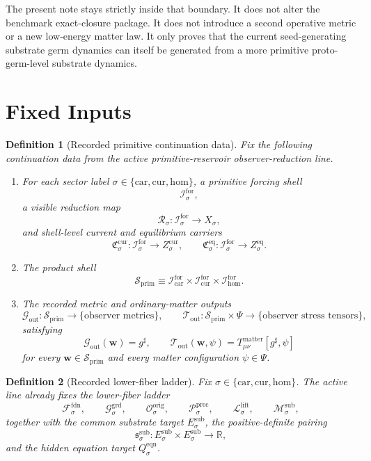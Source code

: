 \documentclass[11pt]{article}
\newcommand{\CompletedMetric}{g^{\sharp}}
\newcommand{\MatterSpace}{\Psi}
\newcommand{\Car}{\mathrm{car}}
\newcommand{\Cur}{\mathrm{cur}}
\newcommand{\Hom}{\mathrm{hom}}
\newcommand{\ForSpace}[1]{\mathcal I_{#1}^{\mathrm{for}}}
\newcommand{\PrimShell}{\mathcal S_{\mathrm{prim}}}
\newcommand{\Reduction}[1]{\mathcal R_{#1}}
\newcommand{\CurrentCarrier}[1]{\mathfrak C_{#1}^{\mathrm{cur}}}
\newcommand{\EqCarrier}[1]{\mathfrak C_{#1}^{\mathrm{eq}}}
\newcommand{\MetricOut}{\mathscr G_{\mathrm{out}}}
\newcommand{\MatterOut}{\mathscr T_{\mathrm{out}}}
\newcommand{\FoundSpace}[1]{\mathcal F_{#1}^{\mathrm{fdn}}}
\newcommand{\GroundSpace}[1]{\mathcal G_{#1}^{\mathrm{grd}}}
\newcommand{\OrigSpace}[1]{\mathcal O_{#1}^{\mathrm{orig}}}
\newcommand{\PrecSpace}[1]{\mathcal P_{#1}^{\mathrm{prec}}}
\newcommand{\LiftSpace}[1]{\mathcal L_{#1}^{\mathrm{lift}}}
\newcommand{\SubSpace}[1]{\mathcal M_{#1}^{\mathrm{sub}}}
\newcommand{\SubTarget}[1]{E_{#1}^{\mathrm{sub}}}
\newcommand{\SubPair}[1]{\mathfrak s_{#1}^{\mathrm{sub}}}
\newcommand{\EqnTarget}[1]{Q_{#1}^{\mathrm{eqn}}}
\newtheorem{definition}{Definition}
\begin{document}
The present note stays strictly inside that boundary. It does not alter the benchmark exact-closure package. It does not introduce a second operative metric or a new low-energy matter law. It only proves that the current seed-generating substrate germ dynamics can itself be generated from a more primitive proto-germ-level substrate dynamics.

\section{Fixed Inputs}

\begin{definition}[Recorded primitive continuation data]
\label{def:fixed}
Fix the following continuation data from the active primitive-reservoir observer-reduction line.
\begin{enumerate}
    \item For each sector label \(\sigma\in\{\Car,\Cur,\Hom\}\), a primitive forcing shell
    \[
    \ForSpace{\sigma},
    \]
    a visible reduction map
    \[
    \Reduction{\sigma}:\ForSpace{\sigma}\to X_{\sigma},
    \]
    and shell-level current and equilibrium carriers
    \[
    \CurrentCarrier{\sigma}:\ForSpace{\sigma}\to Z_{\sigma}^{\mathrm{cur}},
    \qquad
    \EqCarrier{\sigma}:\ForSpace{\sigma}\to Z_{\sigma}^{\mathrm{eq}}.
    \]
    \item The product shell
    \[
    \PrimShell
    \equiv
    \ForSpace{\Car}\times \ForSpace{\Cur}\times \ForSpace{\Hom}.
    \]
    \item The recorded metric and ordinary-matter outputs
    \[
    \MetricOut:\PrimShell\to\{\text{observer metrics}\},
    \qquad
    \MatterOut:\PrimShell\times\MatterSpace\to\{\text{observer stress tensors}\},
    \]
    satisfying
    \begin{equation}
    \MetricOut(\mathbf w)=\CompletedMetric,
    \qquad
    \MatterOut(\mathbf w,\psi)
    =
    T_{\mu\nu}^{\mathrm{matter}}[\CompletedMetric,\psi]
    \label{eq:fixedoutputs}
    \end{equation}
    for every \(\mathbf w\in\PrimShell\) and every matter configuration \(\psi\in\MatterSpace\).
\end{enumerate}
\end{definition}

\begin{definition}[Recorded lower-fiber ladder]
\label{def:ladder}
Fix \(\sigma\in\{\Car,\Cur,\Hom\}\). The active line already fixes the lower-fiber ladder
\[
\FoundSpace{\sigma},
\qquad
\GroundSpace{\sigma},
\qquad
\OrigSpace{\sigma},
\qquad
\PrecSpace{\sigma},
\qquad
\LiftSpace{\sigma},
\qquad
\SubSpace{\sigma},
\]
together with the common substrate target \(\SubTarget{\sigma}\), the positive-definite pairing
\[
\SubPair{\sigma}:
\SubTarget{\sigma}\times\SubTarget{\sigma}\to\mathbb R,
\]
and the hidden equation target \(\EqnTarget{\sigma}\).
\end{definition}
\end{document}
